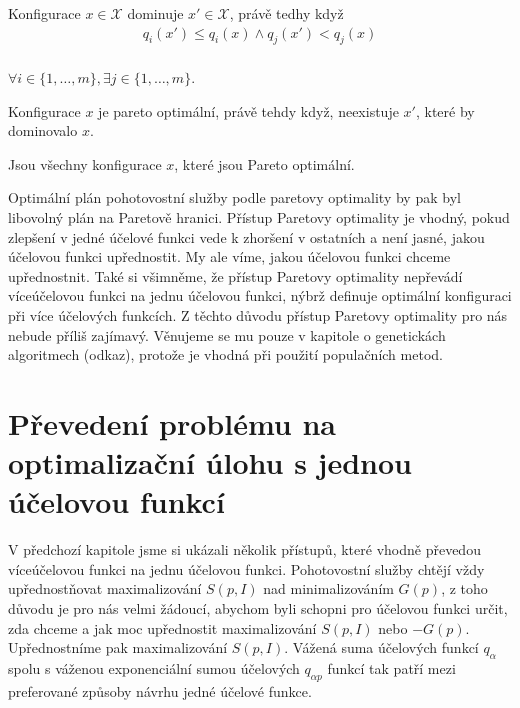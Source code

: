 \begin{definice}[Dominance]
  Konfigurace $x \in \mathcal{X}$ dominuje $x' \in \mathcal{X}$, právě tedhy když
  \begin{align}
    q_i(x') \leq q_i(x) \land q_j(x') < q_j(x)
  \end{align}
  \\
$\forall i \in \{ 1, \dots, m \}, \exists j \in \{ 1, \dots, m \}$.
\\
\end{definice}

\begin{definice}
  Konfigurace $x$ je pareto optimální, právě tehdy když, neexistuje $x'$, které by dominovalo $x$.
  \\
\end{definice}

\begin{definice}
  Jsou všechny konfigurace $x$, které jsou Pareto optimální.
  \\
\end{definice}

Optimální plán pohotovostní služby podle paretovy optimality by pak byl libovolný plán na Paretově hranici.
Přístup Paretovy optimality je vhodný, pokud zlepšení v jedné účelové funkci vede k zhoršení v ostatních a není jasné, jakou účelovou funkci upřednostit.
My ale víme, jakou účelovou funkci chceme upřednostnit.
Také si všimněme, že přístup Paretovy optimality nepřevádí víceúčelovou funkci na jednu účelovou funkci,
nýbrž definuje optimální konfiguraci při více účelových funkcích. 
Z těchto důvodu přístup Paretovy optimality pro nás nebude příliš zajímavý.
Věnujeme se mu pouze v kapitole o genetickách algoritmech (odkaz), protože je vhodná při použití populačních metod.

\section{Převedení problému na optimalizační úlohu s jednou účelovou funkcí}

V předchozí kapitole jsme si ukázali několik přístupů, které vhodně převedou víceúčelovou funkci na jednu účelovou funkci.
Pohotovostní služby chtějí vždy upřednostňovat maximalizování $S(p, I)$ nad minimalizováním $G(p)$,
z toho důvodu je pro nás velmi žádoucí, abychom byli schopni pro účelovou funkci určit, zda chceme a jak moc upřednostit maximalizování $S(p, I)$ nebo $-G(p)$.
Upřednostníme pak maximalizování $S(p, I)$.
Vážená suma účelových funkcí $q_{\alpha}$ spolu s váženou exponenciální sumou účelových $q_{\alpha p}$ funkcí tak patří mezi preferované způsoby návrhu jedné účelové funkce.

